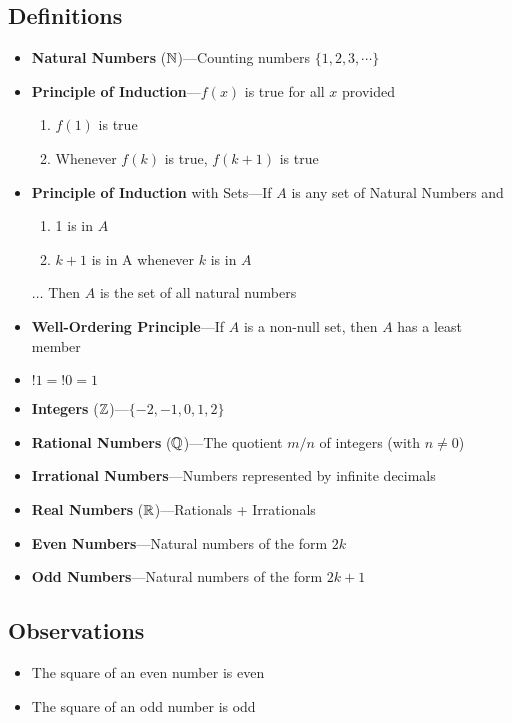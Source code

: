 \documentclass{report}
\begin{document}
\subsection*{Definitions}
\begin{itemize}
  \item \textbf{Natural Numbers} ($\NN$)---Counting numbers $\{1 ,2, 3, \cdots\}$
	\item \textbf{Principle of Induction}---$f (x)$ is true for all $x$ provided
		\begin{enumerate}
			\item $f (1)$ is true
			\item Whenever $f (k)$ is true, $f (k+1)$ is true
		\end{enumerate}
	\item \textbf{Principle of Induction} with Sets---If $A$ is any set of Natural Numbers and
		\begin{enumerate}
			\item 1 is in $A$
			\item $k+1$ is in A whenever $k$ is in $A$
		\end{enumerate} 
	 $\dots$  Then $A$ is the set of all natural numbers
	 \item \textbf{Well-Ordering Principle}---If  $A$ is a non-null set, then $A$ has a least member
	 \item $!1=!0=1$
	 \item \textbf{Integers} (${\ZZ}$)---$\{-2, -1, 0, 1 , 2\}$
	 \item \textbf{Rational Numbers} (${\QQ}$)---The quotient $m/n$ of integers (with $n \neq 0$)
     \item \textbf{Irrational Numbers}---Numbers represented by infinite decimals
	 \item \textbf{Real Numbers} (${\RR}$)---Rationals + Irrationals
	 \item \textbf{Even Numbers}---Natural numbers of the form $2k$
	 \item \textbf{Odd Numbers}---Natural numbers of the form $2k + 1$
\end{itemize}
\subsection*{Observations}
\begin{itemize}
	\item The square of an even number is even
	\item The square of an odd number is odd
\end{itemize}
\end{document}
